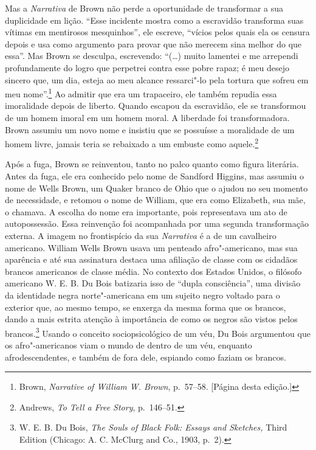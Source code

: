 Mas a \emph{Narrativa} de Brown não perde a oportunidade de transformar
a sua duplicidade em lição. ``Esse incidente mostra como a
escravidão transforma suas vítimas em mentirosos mesquinhos'', ele
escreve, ``vícios pelos quais ela os censura depois e usa como argumento
para provar que não merecem sina melhor do que essa''. Mas Brown se
desculpa, escrevendo: ``(\ldots{}) muito lamentei e me arrependi
profundamente do logro que perpetrei contra esse pobre rapaz; é meu
desejo sincero que, um dia, esteja ao meu alcance ressarci"-lo pela
tortura que sofreu em meu nome''.\footnote{Brown, \emph{Narrative of
  William W. Brown}, p.~57--58. {[}Página \pageref{ref4} desta edição.{]}} Ao admitir
que era um trapaceiro, ele também repudia essa imoralidade depois de
liberto. Quando escapou da escravidão, ele se transformou de um homem
imoral em um homem moral. A liberdade foi transformadora. Brown assumiu
um novo nome e insistiu que se possuísse a moralidade de um homem livre,
jamais teria se rebaixado a um embuste como aquele.\footnote{Andrews,
  \emph{To Tell a Free Story}, p.~146--51.}

Após a fuga, Brown se reinventou, tanto no palco quanto como figura
literária. Antes da fuga, ele era conhecido pelo nome de Sandford
Higgins, mas assumiu o nome de Wells Brown, um Quaker branco de Ohio que
o ajudou no seu momento de necessidade, e retomou o nome de William, que
era como Elizabeth, sua mãe, o chamava. A escolha do nome era
importante, pois representava um ato de autopossessão. Essa reinvenção
foi acompanhada por uma segunda transformação externa. A imagem no
frontispício da sua \emph{Narrativa} é a de um cavalheiro americano.
William Wells Brown usava um penteado afro"-americano, mas sua aparência
e até sua assinatura destaca uma afiliação de classe com os cidadãos
brancos americanos de classe média. No contexto dos Estados Unidos, o
filósofo americano W. E. B. Du Bois batizaria isso de ``dupla
consciência'', uma divisão da identidade negra norte"-americana em um
sujeito negro voltado para o exterior que, ao mesmo tempo, se enxerga da
mesma forma que os brancos, dando a mais estrita atenção à importância
de como os negros são vistos pelos brancos.\footnote{W. E. B. Du Bois,
  \emph{The Souls of Black Folk: Essays and Sketches,} Third Edition
  (Chicago: A. C. McClurg and Co., 1903, p.~2).} Usando o conceito
sociopsicológico de um véu, Du Bois argumentou que os afro"-americanos
viam o mundo de dentro de um véu, enquanto afrodescendentes, e também de
fora dele, espiando como faziam os brancos.

